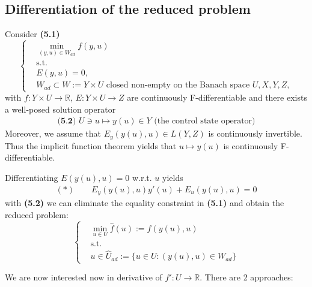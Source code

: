 \subsection{Differentiation of the reduced problem}
Consider \textbf{(5.1)}
\begin{equation}
\left\{	
\begin{aligned}
	&\min_{(y, u) \in W_{ad}} f(y, u) \quad\\
	&\text{s.t.}\\
	&E(y, u) = 0,\\
	&W_{ad} \subset W:= Y \times U \text{ closed non-empty on the Banach space } U, X, Y, Z, 
\end{aligned}
\right.
\end{equation}
with $f:Y \times U \rightarrow \mathbb{R}$, $E: Y \times U \rightarrow Z$ are continuously F-differentiable and there exists a well-posed solution operator
\begin{align*}\textbf{(5.2) }
	U \ni u \mapsto y(u)\in Y \text{ (the control state operator)}
\end{align*}
Moreover, we assume that $E_y(y(u), u) \in L(Y, Z)$ is continuously invertible. Thus the implicit function theorem yields that $u \mapsto y(u)$ is continuously F-differentiable. \par 
Differentiating $E(y(u), u) = 0$ w.r.t. $u$ yields
\begin{align*}
	(*) \qquad
	E_y(y(u), u) y'(u)+ E_u(y(u), u) = 0
\end{align*}
with \textbf{(5.2)} we can eliminate the equality constraint in \textbf{(5.1)} and obtain the reduced problem:
\begin{equation}
\left\{
\begin{aligned}
	&\min_{u \in U} \hat{f}(u):= f(y(u), u)\\
	&\text{s.t.}\\
	& u \in \hat{U}_{ad}:= \{u \in U:(y(u), u) \in W_{ad} \}
\end{aligned}
\right.
\end{equation}

We are now interested now in derivative of $\hat{f}': U \rightarrow \mathbb{R}$. There are 2 approaches:
